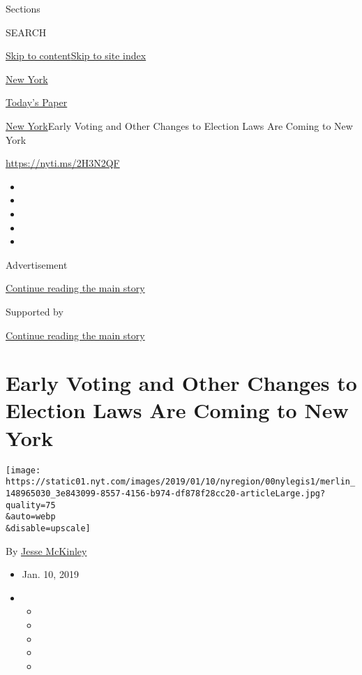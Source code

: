 Sections

SEARCH

\protect\hyperlink{site-content}{Skip to
content}\protect\hyperlink{site-index}{Skip to site index}

\href{https://www.nytimes.com/section/nyregion}{New York}

\href{https://myaccount.nytimes.com/auth/login?response_type=cookie\&client_id=vi}{}

\href{https://www.nytimes.com/section/todayspaper}{Today's Paper}

\href{/section/nyregion}{New York}\textbar{}Early Voting and Other
Changes to Election Laws Are Coming to New York

\url{https://nyti.ms/2H3N2QF}

\begin{itemize}
\item
\item
\item
\item
\item
\end{itemize}

Advertisement

\protect\hyperlink{after-top}{Continue reading the main story}

Supported by

\protect\hyperlink{after-sponsor}{Continue reading the main story}

\hypertarget{early-voting-and-other-changes-to-election-laws-are-coming-to-new-york}{%
\section{Early Voting and Other Changes to Election Laws Are Coming to
New
York}\label{early-voting-and-other-changes-to-election-laws-are-coming-to-new-york}}

\texttt{[image: https://static01.nyt.com/images/2019/01/10/nyregion/00nylegis1/merlin\_148965030\_3e843099-8557-4156-b974-df878f28cc20-articleLarge.jpg?quality=75\\\&auto=webp\\\&disable=upscale]}

By \href{https://www.nytimes.com/by/jesse-mckinley}{Jesse McKinley}

\begin{itemize}
\item
  Jan. 10, 2019
\item
  \begin{itemize}
  \item
  \item
  \item
  \item
  \item
  \end{itemize}
\end{itemize}

